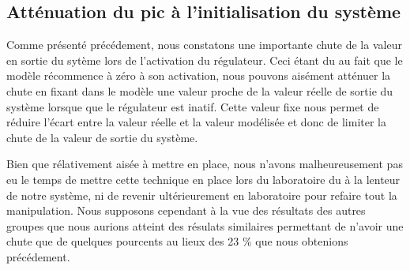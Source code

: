 \subsection{Atténuation du pic à l'initialisation du système}

Comme présenté précédement, nous constatons une importante chute de la valeur en sortie du sytème lors de l'activation du régulateur. Ceci étant du au fait que le modèle récommence à zéro à son activation, nous pouvons aisément atténuer la chute en fixant dans le modèle une valeur proche de la valeur réelle de sortie du système lorsque que le régulateur est inatif. Cette valeur fixe nous permet de réduire l'écart entre la valeur réelle et la valeur modélisée et donc de limiter la chute de la valeur de sortie du système. 

Bien que rélativement aisée à mettre en place, nous n'avons malheureusement pas eu le temps de mettre cette technique en place lors du laboratoire du à la lenteur de notre système, ni de revenir ultérieurement en laboratoire pour refaire tout la manipulation. Nous supposons cependant à la vue des résultats des autres groupes que nous aurions atteint des résulats similaires permettant de n'avoir une chute que de quelques pourcents au lieux des 23 \% que nous obtenions précédement. 






